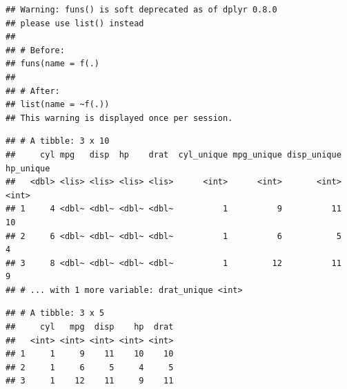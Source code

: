 \documentclass[]{book}
\newenvironment{Shaded}{\begin{snugshade}}{\end{snugshade}}
\newcommand{\CommentTok}[1]{\textcolor[rgb]{0.56,0.35,0.01}{\textit{#1}}}
\newcommand{\DataTypeTok}[1]{\textcolor[rgb]{0.13,0.29,0.53}{#1}}
\newcommand{\DecValTok}[1]{\textcolor[rgb]{0.00,0.00,0.81}{#1}}
\newcommand{\KeywordTok}[1]{\textcolor[rgb]{0.13,0.29,0.53}{\textbf{#1}}}
\newcommand{\NormalTok}[1]{#1}
\newcommand{\OperatorTok}[1]{\textcolor[rgb]{0.81,0.36,0.00}{\textbf{#1}}}
\newcommand{\StringTok}[1]{\textcolor[rgb]{0.31,0.60,0.02}{#1}}
\theoremstyle{definition}
\theoremstyle{definition}
\theoremstyle{definition}
\theoremstyle{remark}
\begin{document}
\begin{enumerate}
\begin{Shaded}
\end{Shaded}

\begin{verbatim}
## Warning: funs() is soft deprecated as of dplyr 0.8.0
## please use list() instead
## 
## # Before:
## funs(name = f(.)
## 
## # After: 
## list(name = ~f(.))
## This warning is displayed once per session.
\end{verbatim}

\begin{verbatim}
## # A tibble: 3 x 10
##     cyl mpg   disp  hp    drat  cyl_unique mpg_unique disp_unique hp_unique
##   <dbl> <lis> <lis> <lis> <lis>      <int>      <int>       <int>     <int>
## 1     4 <dbl~ <dbl~ <dbl~ <dbl~          1          9          11        10
## 2     6 <dbl~ <dbl~ <dbl~ <dbl~          1          6           5         4
## 3     8 <dbl~ <dbl~ <dbl~ <dbl~          1         12          11         9
## # ... with 1 more variable: drat_unique <int>
\end{verbatim}

\begin{Shaded}
\end{Shaded}

\begin{verbatim}
## # A tibble: 3 x 5
##     cyl   mpg  disp    hp  drat
##   <int> <int> <int> <int> <int>
## 1     1     9    11    10    10
## 2     1     6     5     4     5
## 3     1    12    11     9    11
\end{verbatim}
\end{enumerate}
\end{document}

